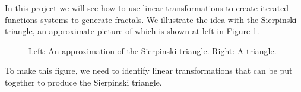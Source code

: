 In this project we will see how to use linear transformations to create iterated functions systems to generate fractals. We illustrate the idea with the Sierpinski triangle, an approximate picture of which is shown at left in Figure \ref{F:Striangle}.
\begin{figure}[h]
\begin{center}
\begin{minipage}{2.0in} \end{minipage} \hspace{0.3in} \vspace{-0.1in} \begin{minipage}{2.0in}   \end{minipage}
\caption{Left: An approximation of the Sierpinski triangle. Right: A triangle.}
\label{F:Striangle}
\end{center}
\end{figure}
To make this figure, we need to identify linear transformations that can be put together to produce the Sierpinski triangle.

